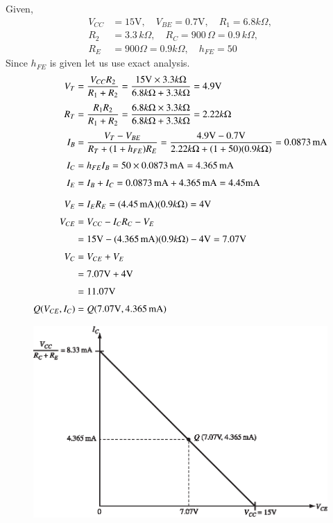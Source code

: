 \begin{solution}
Given,
\begin{align*}
V_{CC} &= 15\text{V},\quad V_{BE}=0.7\text{V},\quad R_{1}=6.8 k\Omega,\\[3pt]
R_{2} &= 3.3\,k\Omega,\quad R_{C}=900\,\Omega = 0.9\,k\Omega,\\[3pt]
R_{E} &= 900\Omega = 0.9 k\Omega,\quad h_{FE}=50
\end{align*}
Since $h_{FE}$ is given let us use exact analysis.
\begin{align*}
V_{T} &= \frac{V_{CC}R_{2}}{R_{1}+R_{2}}=\frac{15\text{V}\times 3.3 k\Omega}{6.8 k\Omega + 3.3 k\Omega}=4.9\text{V}\\[3pt]
R_{T} &= \frac{R_{1}R_{2}}{R_{1}+R_{2}}=\frac{6.8 k\Omega\times 3.3 k\Omega}{6.8 k\Omega + 3.3 k\Omega}=2.22 k\Omega\\[3pt]
I_{B} &= \frac{V_{T}-V_{BE}}{R_{T}+(1+ h_{FE})R_{E}}=\frac{4.9\text{V}-0.7\text{V}}{2.22 k\Omega + (1+50)(0.9 k\Omega)}=0.0873\text{\,mA}\\[3pt]
I_{C} &= h_{FE}I_{B}=50\times 0.0873\text{\,mA}=4.365\text{\,mA}\\[3pt]
I_{E} &= I_{B}+I_{C}=0.0873\text{\,mA}+4.365\text{\,mA}=4.45\text{mA}\\[7pt]
V_{E} &= I_{E}R_{E}=(4.45\text{\,mA})(0.9 k\Omega)=4\text{V}\\[3pt]
V_{CE} &= V_{CC}-I_{C}R_{C}-V_{E}\\[3pt]
&= 15\text{V}-(4.365\text{\,mA})(0.9 k\Omega)-4\text{V}=7.07\text{V}\\[3pt]
V_{C} &= V_{CE}+V_{E}\\[3pt]
&= 7.07\text{V}+4\text{V}\\[3pt]
&= 11.07\text{V}\\[3pt]
Q(V_{CE},I_{C}) &= Q(7.07\text{V}, 4.365\text{\,mA})
\end{align*}
\begin{figure}[H]
\centering
\includegraphics{chap3/S3-EE-03-IN028.eps}
\end{figure}
\vskip -1cm
\end{solution}

